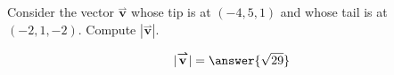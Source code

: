 \documentclass{ximera}
\author{Bart Snapp}
\begin{document}
\begin{exercise}
  Consider the vector $\overset{\boldsymbol{\rightharpoonup}}{\mathbf{v}}$ whose tip is at $(-4,5,1)$ and whose
  tail is at $(-2,1,-2)$. Compute $|\overset{\boldsymbol{\rightharpoonup}}{\mathbf{v}}|$.
  \begin{prompt}
    \[
    |\overset{\boldsymbol{\rightharpoonup}}{\mathbf{v}}|= \answer{\sqrt{29}}
    \]
  \end{prompt}
\end{exercise}
\end{document}

